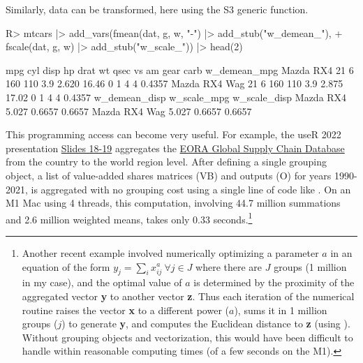 \documentclass[article]{jss}
\newcommand{\fct}[1]{\code{#1()}}
\begin{document}
%
Similarly, data can be transformed, here using the S3 generic \fct{fscale} function.
%
\begin{Schunk}
\begin{Sinput}
R> mtcars |> add_vars(fmean(dat, g, w, "-") |> add_stub("w_demean_"),
+    fscale(dat, g, w) |> add_stub("w_scale_")) |> head(2)
\end{Sinput}
\begin{Soutput}
              mpg cyl disp  hp drat    wt  qsec vs am gear carb w_demean_mpg
Mazda RX4      21   6  160 110  3.9 2.620 16.46  0  1    4    4       0.4357
Mazda RX4 Wag  21   6  160 110  3.9 2.875 17.02  0  1    4    4       0.4357
              w_demean_disp w_scale_mpg w_scale_disp
Mazda RX4             5.027      0.6657       0.6657
Mazda RX4 Wag         5.027      0.6657       0.6657
\end{Soutput}
\end{Schunk}
%
This programming access can become very useful. For example, the useR 2022 presentation \href{https://raw.githubusercontent.com/SebKrantz/collapse/master/misc/useR2022\%20presentation/collapse_useR2022_final.pdf}{Slides 18-19} aggregates the \href{https://worldmrio.com/}{EORA Global Supply Chain Database} from the country to the world region level. After defining a single grouping object, a list of value-added shares matrices (VB) and outputs (O) for years 1990-2021, is aggregated with no grouping cost using a single line of code like . On an M1 Mac using 4 threads, this computation, involving 44.7 million summations and 2.6 million weighted means, takes only 0.33 seconds.\footnote{Another recent example involved numerically optimizing a parameter $a$ in an equation of the form $y_j = \sum_i x_{ij}^a\ \forall j\in J$ where there are $J$ groups (1 million in my case), and the optimal value of $a$ is determined by the proximity of the aggregated vector \textbf{y} to another vector \textbf{z}. Thus each iteration of the numerical routine raises the vector \textbf{x} to a different power ($a$), sums it in 1 million groups ($j$) to generate \textbf{y}, and computes the Euclidean distance to \textbf{z} (using ). Without grouping objects and vectorization, this would have been difficult to handle within reasonable computing times (of a few seconds on the M1).}
%
\end{document}
